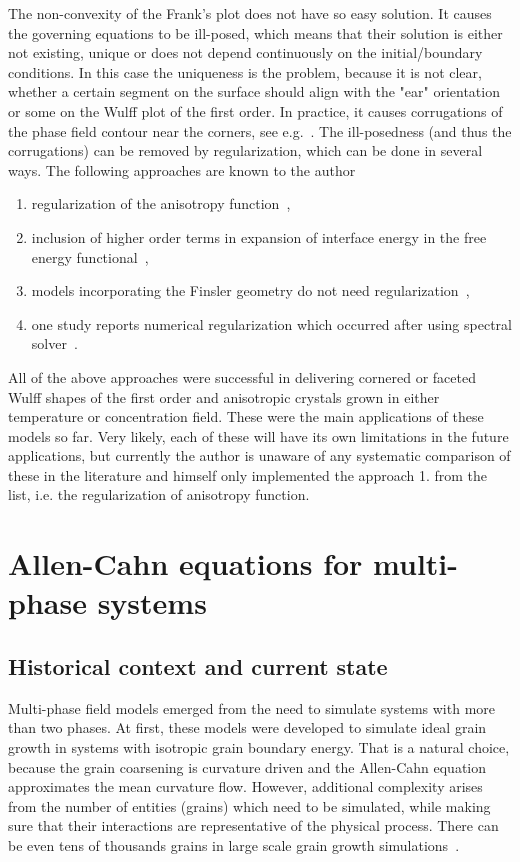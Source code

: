 	The non-convexity of the Frank's plot does not have so easy solution. It causes the governing equations to be ill-posed, which means that their solution is either not existing, unique or does not depend continuously on the initial/boundary conditions. In this case the uniqueness is the problem, because it is not clear, whether a certain segment on the surface should align with the "ear" orientation or some on the Wulff plot of the first order. In practice, it causes corrugations of the phase field contour near the corners, see e.g.~\cite{Tschukin2017}. The ill-posedness (and thus the corrugations) can be removed by regularization, which can be done in several ways. The following approaches are known to the author
	\begin{enumerate}
		\item regularization of the anisotropy function~\cite{Taylor1998,Eggleston2001,Kobayashi2001},
		\item inclusion of higher order terms in expansion of interface energy in the free energy functional~\cite{Wheeler2006, Torabi2009, Tschukin2017},
		\item models incorporating the Finsler geometry do not need regularization~\cite{Bellettini1996,Benes2003},
		\item one study reports numerical regularization which occurred after using spectral solver~\cite{Toth2015}.
	\end{enumerate}
	All of the above approaches were successful in delivering cornered or faceted Wulff shapes of the first order and anisotropic crystals grown in either temperature or concentration field. These were the main applications of these models so far. Very likely, each of these will have its own limitations in the future applications, but currently the author is unaware of any systematic comparison of these in the literature and himself only implemented the approach 1. from the list, i.e. the regularization of anisotropy function.

\section{Allen-Cahn equations for multi-phase systems}
	\subsection{Historical context and current state}
	Multi-phase field models emerged from the need to simulate systems with more than two phases. At first, these models were developed to simulate ideal grain growth in systems with isotropic grain boundary energy. That is a natural choice, because the grain coarsening is curvature driven and the Allen-Cahn equation approximates the mean curvature flow. However, additional complexity arises from the number of entities (grains) which need to be simulated, while making sure that their interactions are representative of the physical process. There can be even tens of thousands grains in large scale grain growth simulations~\cite{Yadav2018}.
	
